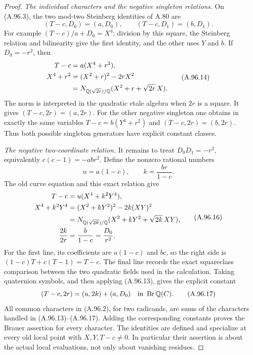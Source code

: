 \begin{proof}
\emph{The individual characters and the negative singleton relations.}
On (A.96.3), the two mod-two Steinberg identities of A.80 are
\[
             (T-c,D_0)=(a,D_0),\qquad
             (T-c,D_1)=(b,D_1).
 \tag{A.96.13}
\]
For example $(T-c)/a+D_0=X^4$; division by this square,
the Steinberg relation and bilinearity give the first
identity, and the other uses $Y$ and $b$.
If $D_0=-r^2$, then
\[
 \begin{split}
 T-c&=a(X^4+r^2),\\
 X^4+r^2
      &=(X^2+r)^2-2rX^2\\
      &=N_{\mathbb Q(\sqrt{2r})/\mathbb Q}(X^2+r+\sqrt{2r}\,X).
 \end{split}
 \tag{A.96.14}
\]
The norm is interpreted in the quadratic etale algebra
when $2r$ is a square.
It gives $(T-c,2r)=(a,2r)$.
For the other negative singleton one obtains in exactly
the same variables
$T-c=b(Y^4+r^2)$ and $(T-c,2r)=(b,2r)$.
Thus both possible singleton generators have explicit
constant classes.

\emph{The negative two-coordinate relation.}
It remains to treat
$D_0D_1=-r^2$, equivalently $c(c-1)=-ab r^2$.
Define the nonzero rational numbers
\[
                    u=a(1-c),\qquad k=\frac{br}{1-c}.
 \tag{A.96.15}
\]
The old curve equation and this exact relation give
\[
 \begin{split}
 T-c&=u(X^4+k^2Y^4),\\
 X^4+k^2Y^4
       &=(X^2+kY^2)^2-2k(XY)^2\\
       &=N_{\mathbb Q(\sqrt{2k})/\mathbb Q}
                    (X^2+kY^2+\sqrt{2k}\,XY),\\
 \frac{2k}{2r}&=\frac{b}{1-c}=\frac{D_0}{r^2}.
 \end{split}
 \tag{A.96.16}
\]
For the first line, its coefficients are
$a(1-c)$ and $bc$, so the right side is
$(1-c)T+c(T-1)=T-c$.
The final line records the exact squareclass comparison
between the two quadratic fields used in the calculation.
Taking quaternion symbols, and then applying (A.96.13),
gives the explicit constant
\[
              (T-c,2r)
                 =(u,2k)+(a,D_0)
                      \quad\text{in }\operatorname{Br}\mathbb Q(C).
 \tag{A.96.17}
\]
All common characters in (A.96.2), for two radicands,
are sums of the characters handled in
(A.96.13)--(A.96.17).
Adding the corresponding constants proves the Brauer
assertion for every character.
The identities are defined and specialize at every
old local point with $X,Y,T-c\ne0$.
In particular their assertion is about the actual local
evaluations, not only about vanishing residues.


\end{proof}
